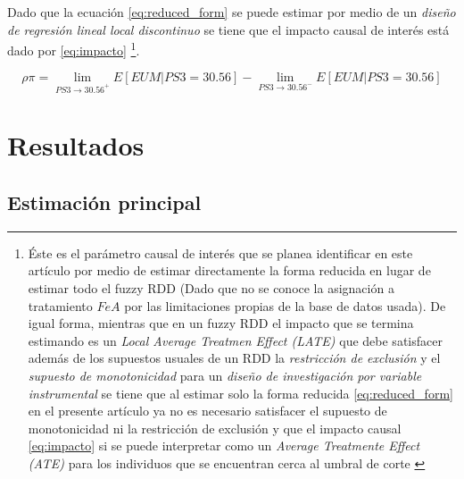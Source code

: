 \documentclass[AER]{AEA}
\begin{document}
Dado que la ecuación \ref{eq:reduced_form} se puede estimar por medio de un \textit{diseño de regresión lineal local discontinuo} se tiene que el impacto causal de interés está dado por \ref{eq:impacto} \footnote{Éste es el parámetro causal de interés  que se planea identificar en este artículo por medio de  estimar directamente la forma reducida en lugar de estimar todo el fuzzy RDD (Dado que no se conoce la asignación a tratamiento $FeA$ por las limitaciones propias de la base de datos usada). De igual forma, mientras que en un fuzzy RDD el impacto que se termina estimando es un \textit{Local Average Treatmen Effect (LATE)} que debe satisfacer además de los supuestos usuales de un RDD la \textit{restricción de exclusión} y el \textit{supuesto de monotonicidad} para un \textit{diseño de investigación por variable instrumental} se tiene que al estimar solo la forma reducida \ref{eq:reduced_form} en el presente artículo ya no es necesario satisfacer el supuesto de monotonicidad ni la restricción de exclusión y que el impacto causal \ref{eq:impacto} si se puede interpretar como un \textit{Average Treatmente Effect (ATE)} para los individuos que se encuentran cerca al umbral de corte \citep{Imbens1994IdentificationEffects}}.


\begin{equation}
    \rho \pi = \lim \limits_{PS3 \to 30.56^{+}} E[EUM | PS3 = 30.56] - \lim \limits_{PS3 \to 30.56^{-}} E[EUM | PS3 = 30.56] \label{eq:impacto}
\end{equation}

\section{Resultados}

\subsection{Estimación principal}

\end{document}
